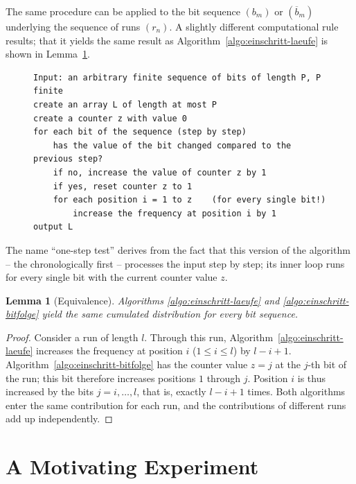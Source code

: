 \documentclass[11pt,a4paper]{scrartcl}
\theoremstyle{plain}
\newtheorem{lemma}[satz]{Lemma}
\theoremstyle{definition}
\theoremstyle{remark}
\begin{document}
\noindent The same procedure can be applied to the bit sequence
$(b_m)$ or $(\overline b_m)$ underlying the sequence of runs $(r_n)$.
A slightly different computational rule results; that it yields the
same result as Algorithm~\ref{algo:einschritt-laeufe} is shown in
Lemma~\ref{lem:aequivalenz}.
\begin{figure}[htbp]
\begin{lstlisting}[caption={One-step test for bit sequences},label={algo:einschritt-bitfolge}]
Input: an arbitrary finite sequence of bits of length P, P finite
create an array L of length at most P
create a counter z with value 0
for each bit of the sequence (step by step)
    has the value of the bit changed compared to the previous step?
    if no, increase the value of counter z by 1
    if yes, reset counter z to 1
    for each position i = 1 to z    (for every single bit!)
        increase the frequency at position i by 1
output L
\end{lstlisting}
\end{figure}
The name \enquote{one-step test} derives from the fact that this
version of the algorithm -- the chronologically first -- processes the
input step by step; its inner loop runs for every single bit with the
current counter value $z$.

\begin{lemma}[Equivalence]\label{lem:aequivalenz}
Algorithms \ref{algo:einschritt-laeufe} and
\ref{algo:einschritt-bitfolge} yield the same cumulated distribution
for every bit sequence.
\end{lemma}

\begin{proof}
Consider a run of length $l$. Through this run,
Algorithm~\ref{algo:einschritt-laeufe} increases the frequency at
position $i$ ($1\leq i\leq l$) by $l-i+1$.
Algorithm~\ref{algo:einschritt-bitfolge} has the counter value $z=j$
at the $j$-th bit of the run; this bit therefore increases positions
$1$ through $j$. Position $i$ is thus increased by the bits
$j=i,\dots,l$, that is, exactly $l-i+1$ times. Both algorithms enter
the same contribution for each run, and the contributions of
different runs add up independently.
\end{proof}

\section{A Motivating Experiment}\label{sec:experiment}
\end{document}
